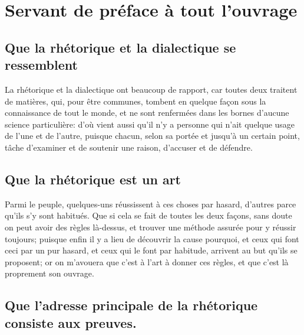 
\section{Servant de préface à tout l'ouvrage}

\subsection{Que la rhétorique et la dialectique se  ressemblent}

La rhétorique et la dialectique  ont beaucoup de rapport, car  toutes deux traitent de matières, qui, pour être communes, tombent
en quelque façon sous la connaissance de tout le monde, et ne sont renfermées dans les bornes d'aucune science particulière: d'où
vient aussi qu'il n'y a personne qui n'ait quelque usage de l'une et de l'autre, puisque chacun, selon sa portée et jusqu'à un
certain point, tâche d'examiner et de soutenir une raison, d'accuser et de défendre.

\subsection{Que la rhétorique est un art}

Parmi le peuple, quelques-uns réussissent à ces choses par hasard, d'autres parce qu'ils s'y sont habitués. Que si cela se fait
de toutes les deux façons, sans doute on peut avoir des règles là-dessus, et trouver une méthode assurée pour y réussir toujours;
puisque enfin il y a lieu de découvrir la cause pourquoi, et ceux qui font ceci par un pur hasard, et ceux qui le font par habitude,
arrivent au but qu'ils se proposent; or on m'avouera que c'est à l'art à donner ces règles, et que c'est là proprement son ouvrage.

\subsection{Que l'adresse principale de la rhétorique consiste aux preuves.}

